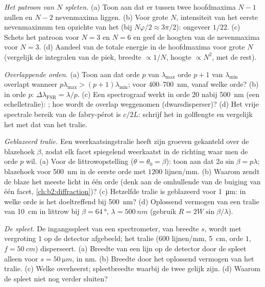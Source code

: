 \begin{exercise}[$\star\star$]\label{exo:b2:gratings:5}
\emph{Het patroon van $N$ spleten.} (a) Toon aan dat er tussen twee hoofdmaxima
$N - 1$ nullen en $N - 2$ nevenmaxima liggen. (b) Voor grote $N$,
intensiteit van het eerste nevenmaximum ten opzichte van het 
(bij $N\varphi/2 \approx 3\pi/2$): ongeveer $1/22$. (c) Schets het patroon voor
$N = 3$ en $N = 6$ en geef de hoogten van de nevenmaxima voor
$N = 3$. (d) Aandeel van de totale energie in de hoofdmaxima voor
grote $N$ (vergelijk de integralen van de piek, breedte $\propto 1/N$, hoogte
$\propto N^2$, met de rest).
\end{exercise}

\begin{exercise}[$\star\star$]\label{exo:b2:gratings:6}
\emph{Overlappende orden.} (a) Toon aan dat orde $p$ van $\lambda_{\max}$
orde $p + 1$ van $\lambda_{\min}$ overlapt wanneer
$p\lambda_{\max} > (p + 1)\lambda_{\min}$; voor $400$--\qty{700}{nm},
vanaf welke orde? (b)  in orde $p$:
$\Delta\lambda_{\text{FSR}}
= \lambda/p$. (c) Een spectrograaf werkt in orde
$20$ nabij \qty{500}{nm} (een
echelletralie): ; hoe wordt de overlap weggenomen
(dwarsdisperser)? (d) Het vrije spectrale bereik van de fabry-pérot is $c/2L$:
schrijf het in golflengte en vergelijk het met dat van het tralie.
\end{exercise}

\begin{exercise}[$\star\star$]\label{exo:b2:gratings:7}
\emph{Geblazeerd tralie.} Een weerkaatsingstralie heeft zijn groeven gekanteld over
de blazehoek $\beta$, zodat elk facet spiegelend weerkaatst in de
richting waar men de orde $p$ wil. (a) Voor de littrowopstelling
($\theta = \theta_0 = \beta$): toon aan dat $2a\sin\beta = p\lambda$;
blazehoek voor \qty{500}{nm}
in de eerste orde met $1200$ lijnen/mm. (b) Waarom zendt de blaze het meeste
licht in één orde (denk aan de omhullende van de buiging van één facet,
\cref{ch:b2:diffraction})? (c) Hetzelfde tralie is geblazeerd
voor \qty{1}{\micro m}: in welke orde is het doeltreffend bij \qty{500}{nm}? (d)
Oplossend vermogen van een tralie van \qty{10}{cm} in littrow bij
$\beta = \qty{64}{\degree}$,
$\lambda = \qty{500}{nm}$ (gebruik $R = 2W\sin\beta/\lambda$).
\end{exercise}

\begin{exercise}[$\star\star$]\label{exo:b2:gratings:8}
\emph{De spleet.} De ingangsspleet van een spectrometer, van breedte $s$, wordt
met vergroting $1$ op de detector afgebeeld; het tralie ($600$ lijnen/mm,
\qty{5}{cm}, orde $1$, $f = \qty{50}{cm}$) disperseert. (a) Breedte van een lijn op
de detector door de spleet alleen voor $s = \qty{50}{\micro m}$, in nm. (b)
Breedte door het oplossend vermogen van het tralie. (c) Welke overheerst;
spleetbreedte
waarbij de twee gelijk zijn. (d) Waarom de spleet niet nog verder sluiten?
\end{exercise}

